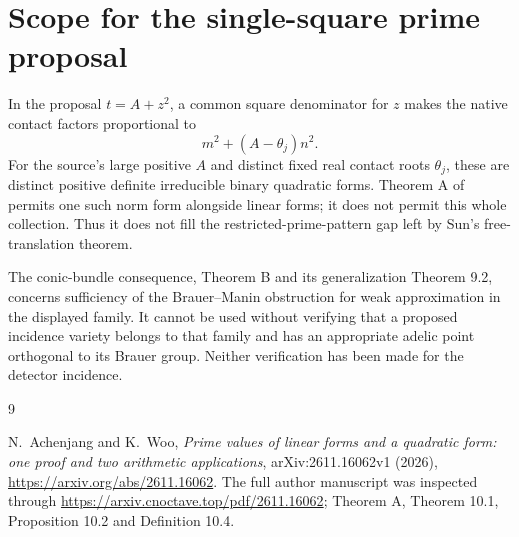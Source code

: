 \documentclass[11pt,a4paper]{article}
\begin{document}
\section{Scope for the single-square prime proposal}

In the proposal $t=A+z^2$, a common square denominator for $z$ makes
the native contact factors proportional to
\[
 m^2+(A-\theta_j)n^2.
\]
For the source's large positive $A$ and distinct fixed real contact
roots $\theta_j$, these are distinct positive definite irreducible
binary quadratic forms. Theorem A of \cite{AW} permits one such norm
form alongside linear forms; it does not permit this whole collection.
Thus it does not fill the restricted-prime-pattern gap left by Sun's
free-translation theorem.

The conic-bundle consequence, Theorem B and its generalization
Theorem 9.2, concerns sufficiency of the Brauer--Manin obstruction
for weak approximation in the displayed family. It cannot be used
without verifying that a proposed incidence variety belongs to that
family and has an appropriate adelic point orthogonal to its Brauer
group. Neither verification has been made for the detector incidence.

\begin{thebibliography}{9}\raggedright
{}N.~Achenjang and K.~Woo,
\emph{Prime values of linear forms and a quadratic form: one proof
and two arithmetic applications}, arXiv:2611.16062v1 (2026),
\url{https://arxiv.org/abs/2611.16062}.
The full author manuscript was inspected through
\url{https://arxiv.cnoctave.top/pdf/2611.16062};
Theorem A, Theorem 10.1, Proposition 10.2 and Definition 10.4.
\end{thebibliography}
\end{document}
